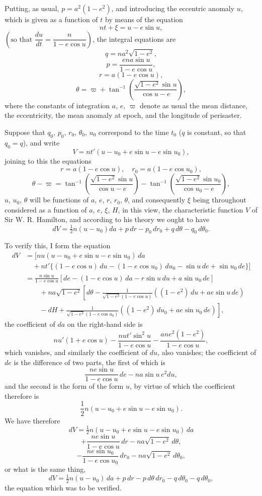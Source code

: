 \documentclass[12pt,a4paper]{article}
\theoremstyle{definition}
\begin{document}
Putting, as usual, $p = a^2(1 - e^2)$, and introducing the eccentric anomaly $u$, which is given
as a function of $t$ by means of the equation
\[
nt + \xi = u - e\sin u,
\]
$\left(\text{so that }\dfrac{du}{dt} = \dfrac{n}{1 - e\cos u}\right)$, the integral equations are
\[
q = na^2\sqrt{1 - e^2},
\]
\[
p = \frac{ena\sin u}{1 - e\cos u},
\]
\[
r = a(1 - e\cos u),
\]
\[
\theta = \varpi + \tan^{-1}\left(\frac{\sqrt{1-e^2}\sin u}{\cos u - e}\right),
\]
where the constants of integration $a$, $e$, $\varpi$ denote as usual the mean distance, the
eccentricity, the mean anomaly at epoch, and the longitude of perisaster.

Suppose that $q_0$, $p_0$, $r_0$, $\theta_0$, $u_0$ correspond to the time $t_0$ ($q$ is constant, so that
$q_0 = q$), and write
\[
V = nt'(u - u_0 + e\sin u - e\sin u_0),
\]
joining to this the equations
\[
r = a(1 - e\cos u),\quad r_0 = a(1 - e\cos u_0),
\]
\[
\theta - \varpi = \tan^{-1}\left(\frac{\sqrt{1-e^2}\sin u}{\cos u - e}\right) - \tan^{-1}\left(\frac{\sqrt{1-e^2}\sin u_0}{\cos u_0 - e}\right),
\]
$u$, $u_0$, $\theta$ will be functions of $a$, $e$, $r$, $r_0$, $\theta$, and consequently $\xi$ being throughout considered
as a function of $a$, $e$, $\xi$, $H$, in this view, the characteristic function $V$ of
Sir W. R. Hamilton, and according to his theory we ought to have
\[
dV = \tfrac{1}{2}n(u - u_0)da + p\,dr - p_0\,dr_0 + q\,d\theta - q_0\,d\theta_0.
\]

To verify this, I form the equation
\begin{align*}
dV &= [nu(u - u_0 + e\sin u - e\sin u_0)\,da\\
&\quad + nt'\{(1 - e\cos u)\,du - (1 - e\cos u_0)\,du_0 - \sin u\,de + \sin u_0\,de\}]\\
&= \frac{n\sin u}{1 - e\cos u}\left[de - (1 - e\cos u)\,da - r\sin u\,du + a\sin u_0\,de\right]\\
&\qquad + na\sqrt{1 - e^2}\left[d\theta - \frac{1}{\sqrt{1-e^2}(1 - e\cos u)}((1 - e^2)\,du + ae\sin u\,de)\right.\\
&\qquad - dH + \left.\frac{1}{\sqrt{1-e^2}(1 - e\cos u_0)}((1 - e^2)\,du_0 + ae\sin u_0\,de)\right],
\end{align*}
the coefficient of $da$ on the right-hand side is
\[
nu'(1 + e\cos u) - \frac{nut'\sin^2 u}{1 - e\cos u} - \frac{ane^2(1 - e^2)}{1 - e\cos u},
\]
which vanishes, and similarly the coefficient of $du$, also vanishes; the coefficient of $de$
is the difference of two parts, the first of which is
\[
\frac{ne\sin u}{1 - e\cos u}\,de - na\sin u\,e^2 du,
\]
and the second is the form of the form $u$, by virtue of which the coefficient therefore is
\[
\frac{1}{2}n(u - u_0 + e\sin u - e\sin u_0).
\]
We have therefore
\[
dV = \tfrac{1}{2}n(u - u_0 + e\sin u - e\sin u_0)\,da
\]
\[
+ \frac{ne\sin u}{1 - e\cos u}\,dr - na\sqrt{1 - e^2}\,d\theta,
\]
\[
- \frac{ne\sin u_0}{1 - e\cos u_0}\,dr_0 - na\sqrt{1 - e^2}\,d\theta_0,
\]
or what is the same thing,
\[
dV = \tfrac{1}{2}n(u - u_0)\,da + p\,dr - p\,d\theta\,dr_0 - q\,d\theta_0 - q\,d\theta_0,
\]
the equation which was to be verified.
\end{document}
